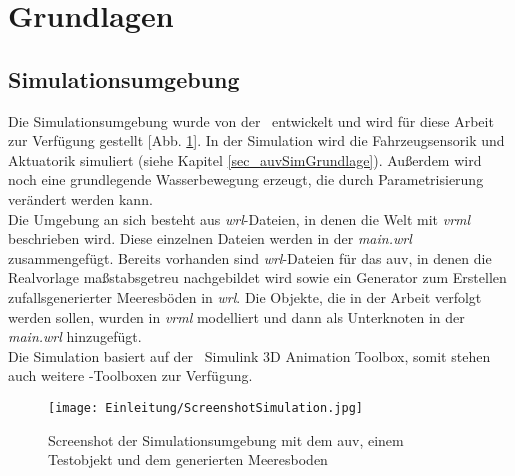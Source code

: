 \cleardoublepage
\section{Grundlagen}
\subsection{Simulationsumgebung}
Die Simulationsumgebung wurde von der \atlas\ entwickelt und wird für diese Arbeit zur Verfügung gestellt [Abb. \ref{screenSim}].
In der Simulation wird die Fahrzeugsensorik und Aktuatorik simuliert (siehe Kapitel \ref{sec_auvSimGrundlage}). Außerdem wird noch eine grundlegende Wasserbewegung erzeugt, die durch Parametrisierung verändert werden kann.\\

Die Umgebung an sich besteht aus \textit{wrl}-Dateien, in denen die Welt mit \textit{\gls{vrml}} beschrieben wird. Diese einzelnen Dateien werden in der \textit{main.wrl} zusammengefügt. Bereits vorhanden sind \textit{wrl}-Dateien für das \gls{auv}, in denen die Realvorlage maßstabsgetreu nachgebildet wird sowie ein Generator zum Erstellen zufallsgenerierter Meeresböden in \textit{wrl}. Die Objekte, die in der Arbeit verfolgt werden sollen, wurden in \textit{\gls{vrml}} modelliert und dann als Unterknoten in der \textit{main.wrl} hinzugefügt.\\
Die Simulation basiert auf der \matlab\ Simulink 3D Animation Toolbox, somit stehen auch weitere \matlab -Toolboxen zur Verfügung. 
\begin{figure}[H]
\texttt{[image: Einleitung/ScreenshotSimulation.jpg]}
\caption[Screenshot der Simulationsumgebung]{Screenshot der Simulationsumgebung mit dem \gls{auv}, einem Testobjekt und dem generierten Meeresboden}
\label{screenSim}
\end{figure}
